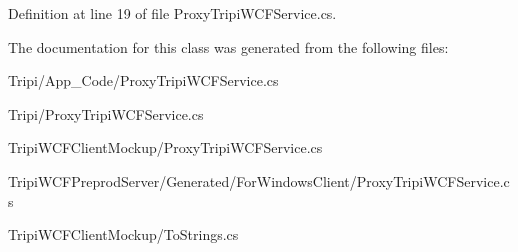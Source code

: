 Definition at line 19 of file ProxyTripiWCFService.cs.

The documentation for this class was generated from the following files:\begin{DoxyCompactItemize}
\item 
Tripi/App\_\-Code/ProxyTripiWCFService.cs\item 
Tripi/ProxyTripiWCFService.cs\item 
TripiWCFClientMockup/ProxyTripiWCFService.cs\item 
TripiWCFPreprodServer/Generated/ForWindowsClient/ProxyTripiWCFService.cs\item 
TripiWCFClientMockup/ToStrings.cs\end{DoxyCompactItemize}
